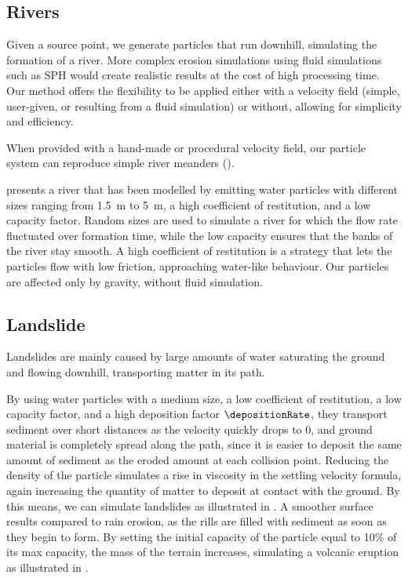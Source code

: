 \subsection{Rivers}

Given a source point, we generate particles that run downhill, simulating the formation of a river. More complex erosion simulations using fluid simulations such as SPH \cite{Kristof2009} would create realistic results at the cost of high processing time. Our method offers the flexibility to be applied either with a velocity field (simple, user-given, or resulting from a fluid simulation) or without, allowing for simplicity and efficiency.

When provided with a hand-made or procedural velocity field, our particle system can reproduce simple river meanders (). 

 presents a river that has been modelled by emitting water particles with different sizes ranging from \SI{1.5}{\meter} to \SI{5}{\meter}, a high coefficient of restitution, and a low capacity factor. Random sizes are used to simulate a river for which the flow rate fluctuated over formation time, while the low capacity ensures that the banks of the river stay smooth. A high coefficient of restitution is a strategy that lets the particles flow with low friction, approaching water-like behaviour. Our particles are affected only by gravity, without fluid simulation.

\subsection{Landslide}

Landslides are mainly caused by large amounts of water saturating the ground and flowing downhill, transporting matter in its path.

By using water particles with a medium size, a low coefficient of restitution, a low capacity factor, and a high deposition factor $\depositionRate$, they transport sediment over short distances as the velocity quickly drops to 0, and ground material is completely spread along the path, since it is easier to deposit the same amount of sediment as the eroded amount at each collision point. Reducing the density of the particle simulates a rise in viscosity in the settling velocity formula, again increasing the quantity of matter to deposit at contact with the ground. By this means, we can simulate landslides as illustrated in . A smoother surface results compared to rain erosion, as the rills are filled with sediment as soon as they begin to form.  
By setting the initial capacity of the particle equal to 10\% of its max capacity, the mass of the terrain increases, simulating a volcanic eruption as illustrated in .

